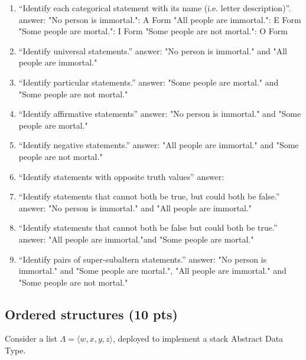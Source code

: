 \documentclass[12pt]{article}
\begin{document}
\begin{enumerate}
\item  ``Identify each categorical statement with its name (i.e. letter description)''.
\subitem answer:
\subitem "No person is immortal.": A Form
\subitem "All people are immortal.": E Form
\subitem "Some people are mortal.": I Form
\subitem "Some people are not mortal.": O Form 

\item ``Identify universal statements.''
\subitem answer: 
\subitem "No person is immortal." and "All people are immortal."

\item ``Identify particular statements.''
\subitem answer:
\subitem "Some people are mortal." and "Some people are not mortal."

\item ``Identify affirmative statements''
\subitem answer:
\subitem "No person is immortal." and "Some people are mortal."

\item ``Identify negative statements.''
\subitem answer: 
\subitem "All people are immortal." and "Some people are not mortal."

\item ``Identify statements with opposite truth values''
\subitem answer:  

\item ``Identify statements that cannot both be true, but could both be false.''
\subitem answer:  
\subitem "No person is immortal." and "All people are immortal."

\item ``Identify statements that cannot both be false but could both be true.''
\subitem answer:  
\subitem "All people are immortal."and "Some people are mortal."

\item ``Identify pairs of super-subaltern statements.''
\subitem answer: 
\subitem "No person is immortal." and "Some people are mortal.",  
\subitem "All people are immortal." and "Some people are not mortal."

\end{enumerate}


\newpage

\subsection{Ordered structures (10 pts)}

Consider a list $\Lambda = \langle w, x, y, z \rangle$, deployed to implement a stack Abstract Data Type.
\end{document}
